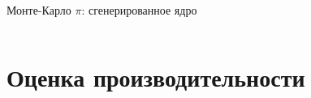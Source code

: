 \documentclass[@BEAMER_OPTIONS@]{beamer}
\begin{document}
\begin{frame}[fragile]{Монте-Карло $\pi$: сгенерированное ядро}
\begin{columns}
\begin{column}[t]{0.3\textwidth}
\begin{exampleblock}{}
                \begin{adjustbox}{width=0.23\textwidth, height=\textheight, keepaspectratio}
                    \begin{minipage}{\textwidth}
                        
                        \vspace{\baselineskip}
                    \end{minipage}
                \end{adjustbox}
            \end{exampleblock}
        \end{column}
    \end{columns}
\end{frame}

\section{Оценка производительности}

\begin{frame}
    \sectionpage
\end{frame}
\end{document}

